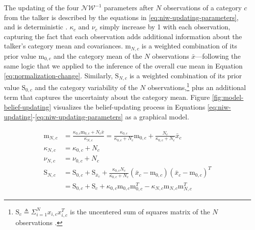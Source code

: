 \documentclass[
  11pt,
  man,floatsintext]{apa6}
\begin{document}
The updating of the four \(\mathcal{NW^{-1}}\) parameters after \(N\) observations of a category \(c\) from the talker is described by the equations in \eqref{eq:niw-updating-parameters}, and is deterministic \autocite[for details and derivation, see][p.~134]{murphy2012}. \(\kappa_c\) and \(\nu_c\) simply increase by 1 with each observation, capturing the fact that each observation adds additional information about the talker's category mean and covariances. \(\mathrm{m}_{N,c}\) is a weighted combination of its prior value \(\mathrm{m}_{0,c}\) and the category mean of the \(N\) observations \(\bar{x}\)---following the same logic that we applied to the inference of the overall cue mean in Equation \eqref{eq:normalization-change}. Similarly, \(\mathrm{S}_{N,c}\) is a weighted combination of its prior value \(\mathrm{S}_{0,c}\) and the category variability of the \(N\) observations,\footnote{\(\mathrm{S}_c \triangleq \Sigma_{i=1}^N x_{i,c} x_{i,c}^T\) is the uncentered sum of squares matrix of the \(N\) observations \autocite{murphy2012}.} plus an additional term that captures the uncertainty about the category mean. Figure \ref{fig:model-belief-updating} visualizes the belief-updating process in Equations \eqref{eq:niw-updating}-\eqref{eq:niw-updating-parameters} as a graphical model.

\begin{equation}\label{eq:niw-updating-parameters}
\begin{split}
\mathrm{m}_{N,c} & = \frac{\kappa_{0,c} \mathrm{m}_{0,c} + N_c \bar{x}}{\kappa_{N,c}} = \frac{\kappa_{0,c}}{\kappa_{0,c} + N_c} \mathrm{m}_{0,c} + \frac{N_c}{\kappa_{0,c} + N_c}\bar{x}_c \\
\kappa_{N,c} & = \kappa_{0,c} + N_c \\
\nu_{N,c} & = \nu_{0,c} + N_c \\
\mathrm{S}_{N,c} & = \mathrm{S}_{0,c} + \mathrm{S}_{\bar{x}_c} + \frac{\kappa_{0,c} N_c}{\kappa_{0,c} + N_c}\left( \bar{x}_c-\mathrm{m}_{0,c} \right) \left( \bar{x}_c-\mathrm{m}_{0,c} \right)^T \\
 & = \mathrm{S}_{0,c} + \mathrm{S}_c + \kappa_{0,c} \mathrm{m}_{0,c} \mathrm{m}_{0,c}^T - \kappa_{N,c} \mathrm{m}_{N,c} \mathrm{m}_{N,c}^T
\end{split}
\end{equation}
\end{document}
